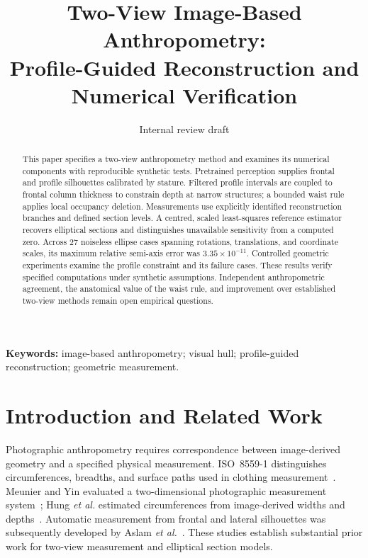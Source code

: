 \documentclass[11pt,a4paper]{article}
\title{Two-View Image-Based Anthropometry:\\
Profile-Guided Reconstruction and Numerical Verification}
\author{Internal review draft}
\date{}
\begin{document}
\maketitle

\begin{abstract}
This paper specifies a two-view anthropometry method and examines its numerical components with reproducible synthetic tests. Pretrained perception supplies frontal and profile silhouettes calibrated by stature. Filtered profile intervals are coupled to frontal column thickness to constrain depth at narrow structures; a bounded waist rule applies local occupancy deletion. Measurements use explicitly identified reconstruction branches and defined section levels. A centred, scaled least-squares reference estimator recovers elliptical sections and distinguishes unavailable sensitivity from a computed zero. Across 27 noiseless ellipse cases spanning rotations, translations, and coordinate scales, its maximum relative semi-axis error was $3.35\times10^{-11}$. Controlled geometric experiments examine the profile constraint and its failure cases. These results verify specified computations under synthetic assumptions. Independent anthropometric agreement, the anatomical value of the waist rule, and improvement over established two-view methods remain open empirical questions.
\end{abstract}
\noindent\textbf{Keywords:} image-based anthropometry; visual hull; profile-guided reconstruction; geometric measurement.

\section{Introduction and Related Work}
Photographic anthropometry requires correspondence between image-derived geometry and a specified physical measurement. ISO~8559-1 distinguishes circumferences, breadths, and surface paths used in clothing measurement~\cite{iso8559}. Meunier and Yin evaluated a two-dimensional photographic measurement system~\cite{meunier2000}; Hung \emph{et al.} estimated circumferences from image-derived widths and depths~\cite{hung2004}. Automatic measurement from frontal and lateral silhouettes was subsequently developed by Aslam \emph{et al.}~\cite{aslam2017}. These studies establish substantial prior work for two-view measurement and elliptical section models.
\end{document}
